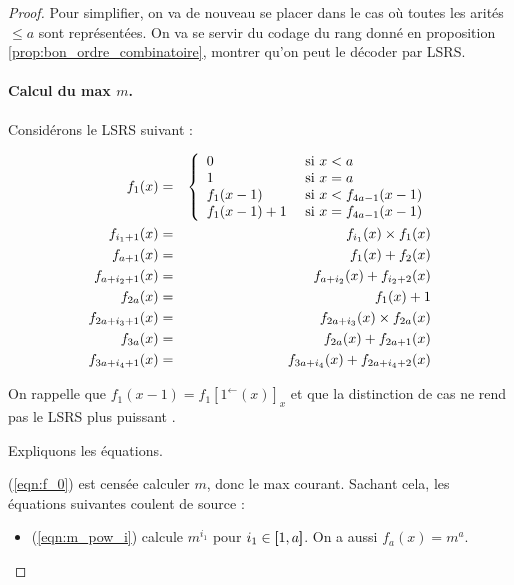 \documentclass{report}
\newcommand{\eqpred}[3]{#1\left[ #2^{\leftarrow}(#3) \right]_{#3}}
\begin{document}
	\begin{proof}
		Pour simplifier, on va de nouveau se placer dans le cas où toutes les arités $\leqslant a$ sont représentées\footnotemark. On va se servir du codage du rang donné en proposition \ref{prop:bon_ordre_combinatoire}, montrer qu'on peut le décoder par LSRS.
		
			
		\paragraph{Calcul du max $m$.} 
			Considérons le LSRS suivant :
			
				\begin{eqnarray}
					f_1(x) & = & \left\lbrace \begin{array}{ll} 	
									0 & \text{ si $x < a$} \\
									1 & \text{ si $x = a$} \\
									f_1(x-1) & \text{ si $x < f_{4a-1}(x-1)$} \\
									f_1(x-1)+1 & \text{ si $x = f_{4a-1}(x-1)$}
									 \end{array} \right. 
									\label{eqn:f_0}\\
					f_{i_1 + 1}(x) & = & f_{i_1}(x) \times f_1(x) \label{eqn:m_pow_i}\\
					f_{a + 1}(x) & = & f_{1}(x) + f_{2}(x) \label{eqn:sum_m_pow_init}\\
					f_{a + i_2 + 1}(x) & = & f_{a + i_2}(x) + f_{i_2 + 2}(x) \label{eqn:sum_m_pow}\\
					f_{2a}(x) & = & f_1(x) + 1 \label{eqn:m_plus_1}\\
					f_{2a + i_3 + 1}(x) & = & f_{2a + i_3}(x) \times f_{2a}(x) \label{eqn:m1_pow_i}\\
					f_{3a}(x) & = & f_{2a}(x) + f_{2a + 1}(x) \label{eqn:sum_m1_pow_init}\\
					f_{3a + i_4 + 1}(x) & = & f_{3a + i_4}(x) + f_{2a + i_4+2}(x) \label{eqn:sum_m1_pow}
				\end{eqnarray}
		
			On rappelle que $f_1(x-1) = \eqpred{f_1}{1}{x}$ et que la distinction de cas ne rend pas le LSRS plus puissant \cite{GrandjeanSchwentick2002}. 
			
			Expliquons les équations.
			
			(\ref{eqn:f_0}) est censée calculer $m$, donc le max courant. Sachant cela, les équations suivantes coulent de source : 
			
			\begin{itemize}
				\item 	(\ref{eqn:m_pow_i}) calcule $m^{i_1}$ pour $i_1 \in \left[\!\!\>\!\left[ 1 , a \right]\!\!\>\!\right]$. On a aussi $f_{a}(x) = m^a$. 
				

\end{itemize}
\end{proof}
\end{document}
